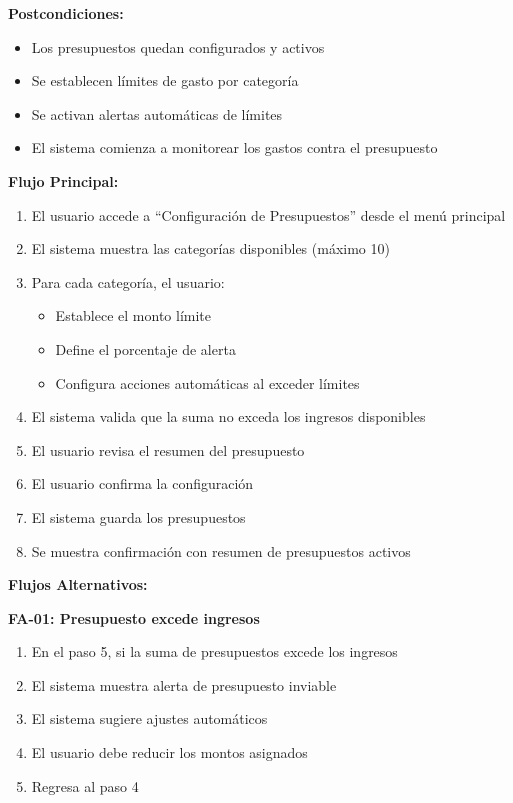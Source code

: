 \noindent\textbf{Postcondiciones:}
\begin{itemize}
    \item Los presupuestos quedan configurados y activos
    \item Se establecen límites de gasto por categoría
    \item Se activan alertas automáticas de límites
    \item El sistema comienza a monitorear los gastos contra el presupuesto
\end{itemize}

\noindent\textbf{Flujo Principal:}
\begin{enumerate}
    \item El usuario accede a ``Configuración de Presupuestos'' desde el menú principal
    \item El sistema muestra las categorías disponibles (máximo 10)
    \item Para cada categoría, el usuario:
    \begin{itemize}
        \item Establece el monto límite
        \item Define el porcentaje de alerta
        \item Configura acciones automáticas al exceder límites
    \end{itemize}
    \item El sistema valida que la suma no exceda los ingresos disponibles
    \item El usuario revisa el resumen del presupuesto
    \item El usuario confirma la configuración
    \item El sistema guarda los presupuestos
    \item Se muestra confirmación con resumen de presupuestos activos
\end{enumerate}

\noindent\textbf{Flujos Alternativos:}

\textbf{FA-01: Presupuesto excede ingresos}
\begin{enumerate}
    \item En el paso 5, si la suma de presupuestos excede los ingresos
    \item El sistema muestra alerta de presupuesto inviable
    \item El sistema sugiere ajustes automáticos
    \item El usuario debe reducir los montos asignados
    \item Regresa al paso 4
\end{enumerate}

